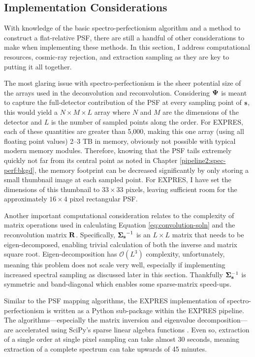 \subsection{Implementation Considerations} \label{pipeline2:spec-perf:implement}

With knowledge of the basic spectro-perfectionism algorithm and a method to construct a flat-relative PSF, there are still a handful of other considerations to make when implementing these methods. In this section, I address computational resources, cosmic-ray rejection, and extraction sampling as they are key to putting it all together.

The most glaring issue with spectro-perfectionism is the sheer potential size of the arrays used in the deconvolution and reconvolution. Considering $\vb{\Psi}$ is meant to capture the full-detector contribution of the PSF at every sampling point of $\vb{s}$, this would yield a $N \times M \times L$ array where $N$ and $M$ are the dimensions of the detector and $L$ is the number of sampled points along the order. For EXPRES, each of these quantities are greater than 5,000, making this one array (using all floating point values) 2--3 TB in memory, obviously not possible with typical modern memory modules. Therefore, knowing that the PSF tails extremely quickly not far from its central point as noted in Chapter \ref{pipeline2:spec-perf:bkgd}, the memory footprint can be decreased significantly by only storing a small thumbnail image at each sampled point. For EXPRES, I have set the dimensions of this thumbnail to $33 \times 33$ pixels, leaving sufficient room for the approximately $16 \times 4$ pixel rectangular PSF.

Another important computational consideration relates to the complexity of matrix operations used in calculating Equation \ref{eq:convolution-soln} and the reconvolution matrix $\vb{R}$. Specifically, $\vb{\Sigma_s}^{-1}$ is an $L \times L$ matrix that needs to be eigen-decomposed, enabling trivial calculation of both the inverse and matrix square root. Eigen-decomposition has $\mathcal{O}(L^3)$ complexity, unfortunately, meaning this problem does not scale very well, especially if implementing increased spectral sampling as discussed later in this section. Thankfully $\vb{\Sigma}_{\vb{s}}^{-1}$ is symmetric and band-diagonal which enables some sparse-matrix speed-ups.

Similar to the PSF mapping algorithms, the EXPRES implementation of spectro-per\-fectionism is written as a Python sub-package within the EXPRES pipeline. The algori\-thms---especially the matrix inversion and eigenvalue decomposition---are accelerated using SciPy's sparse linear algebra functions \citep{virtanen_scipy_2020}. Even so, extraction of a single order at single pixel sampling can take almost 30 seconds, meaning extraction of a complete spectrum can take upwards of 45 minutes.


